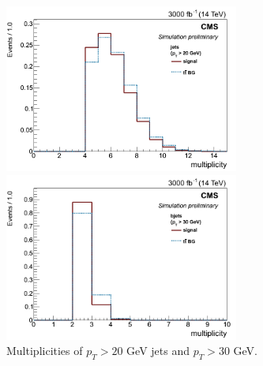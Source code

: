 \documentclass[10pt,a4paper]{article}
\newcommand{\ww}{7.7cm} %
\newcommand{\dd}{-2mm} %
\begin{document}
\begin{figure}[h]
    \begin{minipage}[h!]{\ww}
      \centering
      \includegraphics[width=\ww]{figs/Njets20.png}
    \end{minipage}
    \begin{minipage}[h!]{\ww}
      \centering
      \includegraphics[width=\ww]{figs/Nbjets30.png}
    \end{minipage}
  \vspace{\dd}
  \caption{Multiplicities of $p_T>20$ GeV jets and $p_T>30$ GeV.} \label{multi}
\end{figure}
\end{document}
